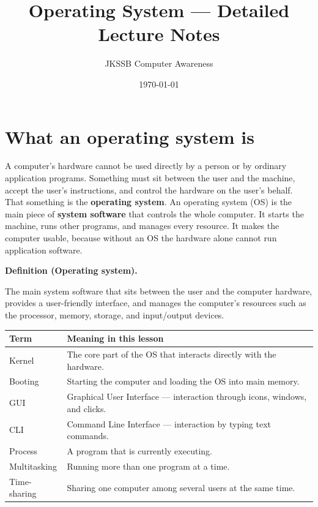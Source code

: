 \documentclass[11pt]{article}
\title{Operating System --- Detailed Lecture Notes}
\author{JKSSB Computer Awareness}
\date{\today}
\newenvironment{definitionbox}[1]{%
  \par\noindent\textbf{Definition (#1).}\ \itshape
}{\par\vspace{0.3em}}
\begin{document}
\maketitle

\section{What an operating system is}
A computer's hardware cannot be used directly by a person or by ordinary
application programs. Something must sit between the user and the machine,
accept the user's instructions, and control the hardware on the user's behalf.
That something is the \textbf{operating system}. An operating system (OS) is
the main piece of \textbf{system software} that controls the whole computer. It
starts the machine, runs other programs, and manages every resource. It makes
the computer usable, because without an OS the hardware alone cannot run
application software.

\begin{definitionbox}{Operating system}
The main system software that sits between the user and the computer hardware,
provides a user-friendly interface, and manages the computer's resources such
as the processor, memory, storage, and input/output devices.
\end{definitionbox}

\begin{center}
\begin{tabular}{p{}p{}}
\toprule
\textbf{Term} & \textbf{Meaning in this lesson} \\
\midrule
Kernel & The core part of the OS that interacts directly with the hardware. \\
Booting & Starting the computer and loading the OS into main memory. \\
GUI & Graphical User Interface --- interaction through icons, windows, and clicks. \\
CLI & Command Line Interface --- interaction by typing text commands. \\
Process & A program that is currently executing. \\
Multitasking & Running more than one program at a time. \\
Time-sharing & Sharing one computer among several users at the same time. \\
\bottomrule
\end{tabular}
\end{center}
\end{document}
